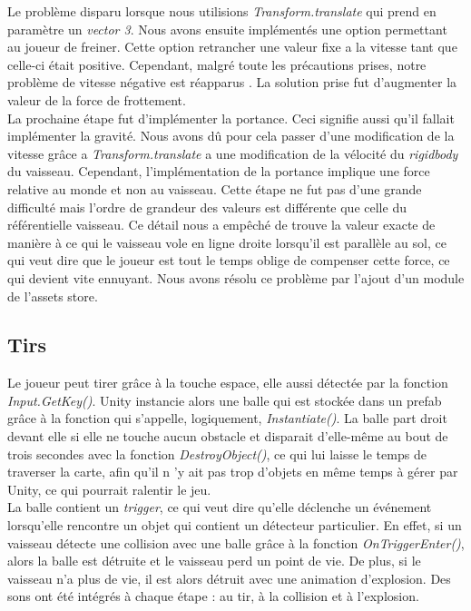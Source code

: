 \documentclass[12pt, titlepage]{article}
\begin{document}
\begin{spacing}{1.5}
Le problème disparu lorsque nous utilisions \textit{Transform.translate} qui prend en paramètre un \textit{vector 3}. Nous avons ensuite implémentés une option permettant au joueur de freiner. Cette option retrancher une valeur fixe a la vitesse tant que celle-ci était positive. Cependant, malgré toute les précautions prises, notre problème de vitesse négative est réapparus . La solution prise fut d'augmenter la valeur de la force de frottement. \\

La prochaine étape fut d'implémenter la portance. Ceci signifie aussi qu’il fallait implémenter la gravité. Nous avons dû pour cela passer d’une modification de la vitesse grâce a \textit{Transform.translate} a une modification de la vélocité du \textit{rigidbody} du vaisseau. Cependant, l'implémentation de la portance implique une force relative au monde et non au vaisseau. Cette étape ne fut pas d’une grande difficulté mais l'ordre de grandeur des valeurs est différente que celle du référentielle vaisseau. Ce détail nous a empêché de trouve la valeur exacte de manière à ce qui le vaisseau vole en ligne droite lorsqu'il est parallèle au sol, ce qui veut dire que le joueur est tout le temps oblige de compenser cette force, ce qui devient vite ennuyant. Nous avons résolu ce problème par l'ajout d'un module de l'assets store.\\

\subsection{Tirs}

Le joueur peut tirer grâce à la touche espace, elle aussi détectée par la fonction \textit{Input.GetKey()}. Unity instancie alors une balle qui est stockée dans un prefab grâce à la fonction qui s'appelle, logiquement, \textit{Instantiate()}. La balle part droit devant elle si elle ne touche aucun obstacle et disparait d'elle-même au bout de trois secondes avec la fonction \textit{DestroyObject()}, ce qui lui laisse le temps de traverser la carte, afin qu'il n 'y ait pas trop d'objets en même temps à gérer par Unity, ce qui pourrait ralentir le jeu.\\

La balle contient un \textit{trigger}, ce qui veut dire qu'elle déclenche un événement lorsqu'elle rencontre un objet qui contient un détecteur particulier. En effet, si un vaisseau détecte une collision avec une balle grâce à la fonction \textit{OnTriggerEnter()}, alors la balle est détruite et le vaisseau perd un point de vie. De plus, si le vaisseau n'a plus de vie, il est alors détruit avec une animation d'explosion. Des sons ont été intégrés à chaque étape : au tir, à la collision et à l'explosion.\\


\end{spacing}
\end{document}
